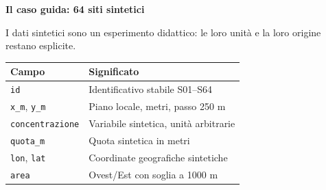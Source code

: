 \documentclass[12pt,aspectratio=1610]{beamer}
\newcommand{\PilotChrome}[4]{%
  \node[anchor=north west,inner sep=0,text width=17.7cm] at ([xshift=.95cm,yshift=-.55cm]current page.north west) {\color{Navy}\bfseries\fontsize{20.6}{24.5}\selectfont #1};
  \node[anchor=north east,inner sep=0] at ([xshift=19.05cm,yshift=-.14cm]current page.north west) {\color{Classical}\fontsize{8}{10}\selectfont\hyperlink{slide2}{#2}};
  \draw[Classical,line width=1.2pt] ([xshift=.95cm,yshift=-1.7cm]current page.north west)--([xshift=2.35cm,yshift=-1.7cm]current page.north west);
  \draw[Rule,line width=.65pt] ([xshift=.95cm,yshift=-10.36cm]current page.north west)--([xshift=19.05cm,yshift=-10.36cm]current page.north west);
  \node[anchor=north west,inner sep=0] at ([xshift=.96cm,yshift=-10.55cm]current page.north west) {\color{Classical}\bfseries\fontsize{9.1}{12}\selectfont DA RICORDARE};
  \node[anchor=north west,inner sep=0,text width=14.3cm] at ([xshift=4.2cm,yshift=-10.53cm]current page.north west) {\color{Ink}\fontsize{10.3}{13.8}\selectfont #4};
  \draw[Rule,line width=.35pt] ([xshift=.95cm,yshift=-11.92cm]current page.north west)--([xshift=19.05cm,yshift=-11.92cm]current page.north west);
  \node[anchor=north west,inner sep=0] at ([xshift=.95cm,yshift=-12.06cm]current page.north west) {\color{Muted}\fontsize{7.7}{9.2}\selectfont Locus: statistica spaziale};
  \node[anchor=north east,inner sep=0] at ([xshift=19.05cm,yshift=-12.06cm]current page.north west) {\color{Muted}\fontsize{7.7}{9.2}\selectfont #3/110};
}
\begin{document}
\begin{frame}[plain]
\begin{lrbox}{\PilotRightBox}
\begin{minipage}[t]{7.55cm}
\end{minipage}\end{lrbox}

\end{frame}

\begin{frame}[plain]\hypertarget{slide5}{}
\begin{lrbox}{\TitleBox}
\begin{minipage}[t]{17.7cm}\raggedright\color{Ink}\fontsize{11.3}{14.8}\selectfont
\color{Navy}\bfseries\fontsize{20.6}{24.5}\selectfont Il caso guida: 64 siti sintetici
\end{minipage}\end{lrbox}

\begin{lrbox}{\RecallBox}
\begin{minipage}[t]{14.3cm}\raggedright\color{Ink}\fontsize{11.3}{14.8}\selectfont
\fontsize{10.3}{13.8}\selectfont I dati sintetici sono un esperimento didattico: le loro unità e la loro origine restano esplicite.
\end{minipage}\end{lrbox}

\begin{lrbox}{\PilotLeftBox}
\begin{minipage}[t]{10.05cm}\raggedright\color{Ink}\fontsize{11.3}{14.8}\selectfont
{\fontsize{10.2}{13.1}\selectfont\renewcommand{\arraystretch}{1.45}\begin{tabular}{@{}p{3.6cm}p{5.5cm}@{}}\toprule
\textbf{Campo} & \textbf{Significato}\\\midrule
\texttt{id} & Identificativo stabile S01--S64\\
\texttt{x\_m}, \texttt{y\_m} & Piano locale, metri, passo 250 m\\
\texttt{concentrazione} & Variabile sintetica, unità arbitrarie\\
\texttt{quota\_m} & Quota sintetica in metri\\
\texttt{lon}, \texttt{lat} & Coordinate geografiche sintetiche\\
\texttt{area} & Ovest/Est con soglia a 1000 m\\
\bottomrule\end{tabular}}


\end{minipage}
\end{lrbox}
\end{frame}
\end{document}
